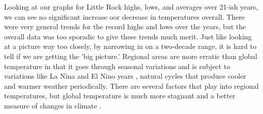 Looking at our graphs for Little Rock highs, lows, and averages over 21-ish years, we can see no significant increase oor decrease in temperatures overall. There were very general trends for the record highs and lows over the years, but the overall data was too sporadic to give these trends much merit. Just like looking at a picture way too closely, by narrowing in on a two-decade range, it is hard to tell if we are getting the 'big picture.' Regional areas are more erratic than global temperature in that it goes through seasonal variations and is subject to variations like La Nina and El Nino years \cite{el_la_nino_nina}, natural cycles that produce cooler and warmer weather periodically. There are several factors that play into regional temperatures, but global temperature is much more stagnant and a better measure of changes in climate \cite{weather_vs_climate}.
